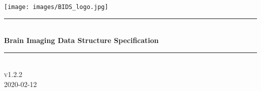 \begin{titlepage}

\newcommand{\HRule}{\rule{\linewidth}{0.5mm}} %

\center %




\texttt{[image: images/BIDS\_logo.jpg]}\\[1cm] 


\HRule \\[0.4cm]
{ \huge \bfseries Brain Imaging Data Structure Specification}\\[0.4cm] %
\HRule \\[1.5cm]


\textsc{\large v1.2.2}\\[0.5cm]{\large 2020-02-12}\\[2cm]\vfill\end{titlepage}